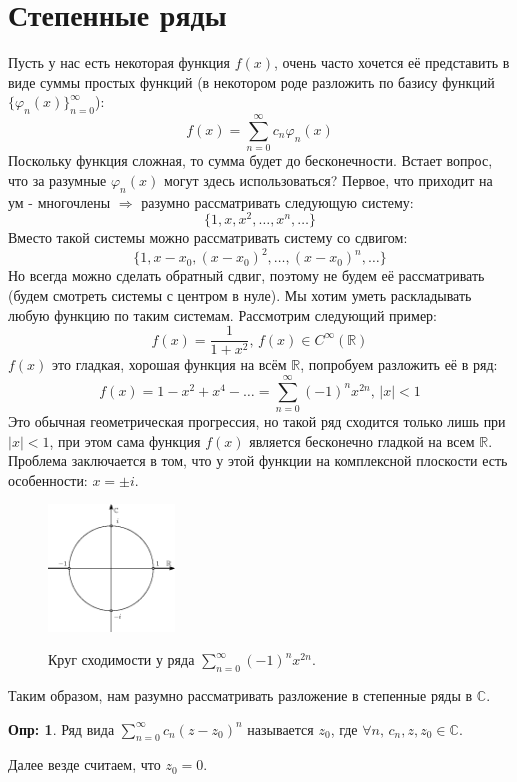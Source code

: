 \documentclass[12pt]{article}
\newcommand{\RN}[1]{%
	\textup{\uppercase\expandafter{\romannumeral#1}}%
}
\newcommand{\MR}{\mathbb{R}}
\newcommand{\MC}{\mathbb{C}}
\theoremstyle{definition}
\newtheorem{defn}{Опр:}
\newcommand{\ddsum}[2]{\displaystyle\sum\limits_{#1}^{#2}}
\begin{document}
\lhead{Математический анализ - \RN{3}}
\section*{Степенные ряды}
Пусть у нас есть некоторая функция $f(x)$, очень часто хочется её представить в виде суммы простых функций (в некотором роде разложить по базису функций $\{\varphi_n(x)\}_{n = 0}^{\infty}$):
$$
	f(x) = \ddsum{n = 0}{\infty}c_n \varphi_n(x)
$$
Поскольку функция сложная, то сумма будет до бесконечности. Встает вопрос, что за разумные $\varphi_n(x)$ могут здесь использоваться? Первое, что приходит на ум - многочлены $\Rightarrow$ разумно рассматривать следующую систему: 
$$
	\{1, x, x^2, \dotsc, x^n, \dotsc\}
$$
Вместо такой системы можно рассматривать систему со сдвигом:
$$
	\{1, x - x_0, (x - x_0)^2, \dotsc, (x - x_0)^n, \dotsc\}
$$
Но всегда можно сделать обратный сдвиг, поэтому не будем её рассматривать (будем смотреть системы с центром в нуле). Мы хотим уметь раскладывать любую функцию по таким системам. Рассмотрим следующий пример:
$$
	f(x) = \dfrac{1}{1+x^2}, \, f(x) \in C^{\infty}(\MR)
$$
$f(x)$ это гладкая, хорошая функция на всём $\MR$, попробуем разложить её в ряд:
$$
	f(x) = 1 - x^2 + x^4 - \dotsc  = \ddsum{n = 0}{\infty}(-1)^n x^{2n}, \, |x| < 1
$$
Это обычная геометрическая прогрессия, но такой ряд сходится только лишь при $|x|<1$, при этом сама функция $f(x)$ является бесконечно гладкой на всем $\MR$. Проблема заключается в том, что у этой функции на комплексной плоскости есть особенности: $x = \pm i$. 
\begin{figure}[H]
	\centering
	\includegraphics[width=0.3\textwidth]{MA3L15_1.eps}
	\label{MA3L15_1}
	\caption{Круг сходимости у ряда $\ddsum{n = 0}{\infty}(-1)^n x^{2n}$.}
	\label{fig:разложение функции)}
\end{figure}

Таким образом, нам разумно рассматривать разложение в степенные ряды в $\MC$.
\begin{defn}
	Ряд вида $\ddsum{n = 0}{\infty}c_n (z - z_0)^n$ называется  $z_0$, где $\forall n , \, c_n,z, z_0 \in \MC$.
\end{defn}
Далее везде считаем, что $z_0 = 0$.
\newpage
\end{document}
